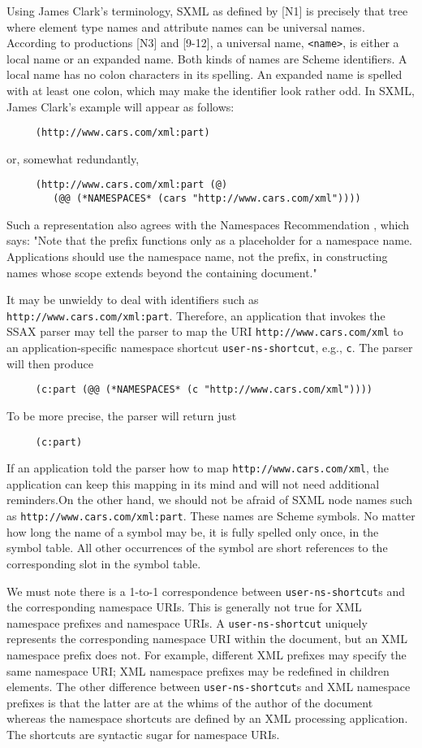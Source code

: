 \documentclass[10pt]{article}
\begin{document}
Using James Clark's terminology, SXML as defined by [N1] is
precisely that tree where element type names and attribute names can
be universal names.  According to productions [N3] and [9-12], a
universal name, \texttt{<name>}, is either a local name or an expanded
name. Both kinds of names are Scheme identifiers. A local name has no
colon characters in its spelling. An expanded name is spelled with at
least one colon, which may make the identifier look rather odd. In
SXML, James Clark's example will appear as follows:\begin{verbatim}
     (http://www.cars.com/xml:part)
\end{verbatim}
or, somewhat redundantly, \begin{verbatim}
     (http://www.cars.com/xml:part (@)
        (@@ (*NAMESPACES* (cars "http://www.cars.com/xml"))))
\end{verbatim}


Such a representation also agrees with the Namespaces Recommendation \cite{XML Namespaces}, which says: "Note that the prefix
functions only as a placeholder for a namespace name. Applications
should use the namespace name, not the prefix, in constructing names
whose scope extends beyond the containing document."

It may be unwieldy to deal with identifiers such as \texttt{http://www.cars.com/xml:part}. Therefore, an application that
invokes the SSAX parser may tell the parser to map the URI \texttt{http://www.cars.com/xml} to an application-specific namespace shortcut \texttt{user-ns-shortcut}, e.g., \texttt{c}. The parser will then produce\begin{verbatim}
     (c:part (@@ (*NAMESPACES* (c "http://www.cars.com/xml"))))
\end{verbatim}
To be more precise, the parser will return just\begin{verbatim}
     (c:part)
\end{verbatim}
If an application told the parser how to map \texttt{http://www.cars.com/xml}, the application can keep this mapping in
its mind and will not need additional reminders.On the other hand, we should not be afraid of SXML node
names such as \texttt{http://www.cars.com/xml:part}. These names
are Scheme symbols. No matter how long the name of a symbol may be, it
is fully spelled only once, in the symbol table. All other occurrences
of the symbol are short references to the corresponding slot in
the symbol table.



We must note there is a 1-to-1 correspondence between \texttt{user-ns-shortcut}s and the corresponding namespace URIs. This is generally not true
for XML namespace prefixes and namespace URIs. A \texttt{user-ns-shortcut} uniquely represents the corresponding namespace
URI within the document, but an XML namespace prefix does not. For
example, different XML prefixes may specify the same namespace
URI; XML namespace prefixes may be redefined in children elements. The
other difference between \texttt{user-ns-shortcut}s and
XML namespace prefixes is that the latter are at the whims of the author
of the document whereas the namespace shortcuts are defined by an
XML processing application. The shortcuts are syntactic sugar for namespace URIs.
\end{document}
